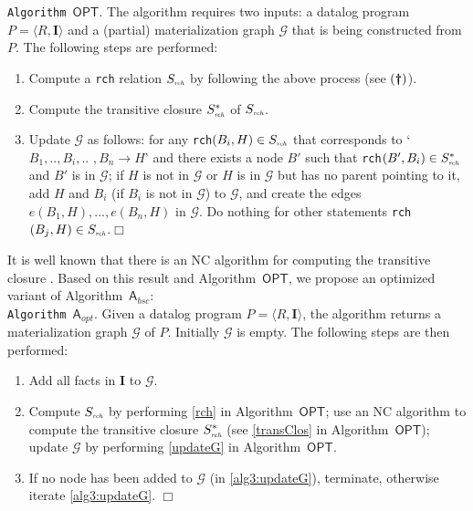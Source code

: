 \documentclass[final,1p,times]{elsarticle}
\begin{document}
\noindent\texttt{Algorithm~$\mathsf{OPT}$}. The algorithm requires two inputs:
a datalog program $P=\langle R, \textbf{I}\rangle$ and a (partial) materialization graph $\mathcal{G}$ that is
being constructed from $P$. The following steps are performed:
\begin{enumerate}[leftmargin=6ex,label=(\textbf{\roman*})]
\item Compute a \texttt{rch} relation $S_{\textit{\tiny rch}}$ by following the above process (see $(\textbf{\dag})$).\label{rch}
\item Compute the transitive closure $S^*_{\textit{\tiny rch}}$ of $S_{\textit{\tiny rch}}$.\label{transClos}
\item Update $\mathcal{G}$ as follows: for any \texttt{rch}$(B_i,H)\in S_{\textit{\tiny rch}}$
that corresponds to `$B_1,..,B_i,..$ $,B_n\rightarrow H$'
    and there exists a node $B'$ such that \texttt{rch}$(B',B_i)\in S^*_{\textit{\tiny rch}}$ and $B'$ is
    in $\mathcal{G}$; if $H$ is not in $\mathcal{G}$ or $H$ is in $\mathcal{G}$ but has no parent pointing
    to it, add $H$ and $B_i$ (if $B_i$ is not in $\mathcal{G}$) to $\mathcal{G}$, and create the edges
    $e(B_1, H),...,e(B_n, H)$ in $\mathcal{G}$. Do nothing for other statements
    \texttt{rch}$(B_j,H)\in S_{\textit{\tiny rch}}$.\label{updateG}\hfill$\Box$
\end{enumerate}

It is well known that there is an NC algorithm for computing the
transitive closure \cite{Allender07}.
Based on this result and Algorithm~$\mathsf{OPT}$, we propose an optimized variant of Algorithm~$\mathsf{A}_{bsc}$:\\

\noindent\texttt{Algorithm~$\mathsf{A}_{opt}$}. Given a datalog program $P=\langle R, \textbf{I}\rangle$, the algorithm
returns a materialization graph $\mathcal{G}$ of $P$. Initially $\mathcal{G}$ is empty. The following steps are then performed:
\begin{enumerate}[leftmargin=8ex,label=(\textit{Step \arabic*}),ref=Step~\arabic*]
\item Add all facts in $\textbf{I}$ to $\mathcal{G}$.\label{alg3:addFacts}
\item Compute $S_{\textit{\tiny rch}}$ by performing \ref{rch} in Algorithm~$\mathsf{OPT}$; use an NC
    algorithm to compute the transitive closure $S^*_{\textit{\tiny rch}}$ (see \ref{transClos} in Algorithm~$\mathsf{OPT}$);
    update $\mathcal{G}$ by performing \ref{updateG}  in Algorithm~$\mathsf{OPT}$.\label{alg3:updateG}
\item If no node has been added to $\mathcal{G}$ (in \ref{alg3:updateG}), terminate,
    otherwise iterate \ref{alg3:updateG}. \label{alg3:halt}\hfill$\Box$
\end{enumerate}
\end{document}
